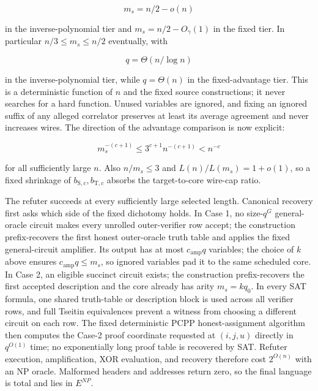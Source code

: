 \documentclass[11pt,letterpaper]{article}
\theoremstyle{definition}
\theoremstyle{remark}
\begin{document}
\[
m_s=n/2-o(n)
\]

in the inverse-polynomial tier and \(m_s=n/2-O_\gamma(1)\) in the fixed
tier. In particular \(n/3\le m_s\le n/2\) eventually, with

\[
q=\Theta(n/\log n)
\]

in the inverse-polynomial tier, while \(q=\Theta(n)\) in the
fixed-advantage tier. This is a deterministic function of \(n\) and the
fixed source constructions; it never searches for a hard function.
Unused variables are ignored, and fixing an ignored suffix of any
alleged correlator preserves at least its average agreement and never
increases wires. The direction of the advantage comparison is now
explicit:

\[
m_s^{-(c+1)}
\le
3^{c+1}n^{-(c+1)}
<n^{-c}
\]

for all sufficiently large \(n\). Also \(n/m_s\le3\) and
\(L(n)/L(m_s)=1+o(1)\), so a fixed shrinkage of
\(b_{\mathrm S,c},b_{\mathrm T,c}\) absorbs the target-to-core wire-cap
ratio.

The refuter succeeds at every sufficiently large selected length.
Canonical recovery first asks which side of the fixed dichotomy holds.
In Case 1, no size-\(q^G\) general-oracle circuit makes every unrolled
outer-verifier row accept; the construction prefix-recovers the first
honest outer-oracle truth table and applies the fixed general-circuit
amplifier. Its output has at most \(c_{\mathrm{amp}}q\) variables; the
choice of \(k\) above ensures \(c_{\mathrm{amp}}q\le m_s\), so ignored
variables pad it to the same scheduled core. In Case 2, an eligible
succinct circuit exists; the construction prefix-recovers the first
accepted description and the core already has arity \(m_s=kq_0\). In
every SAT formula, one shared truth-table or description block is used
across all verifier rows, and full Tseitin equivalences prevent a
witness from choosing a different circuit on each row. The fixed
deterministic PCPP honest-assignment algorithm then computes the Case-2
proof coordinate requested at \((i,j,u)\) directly in \(q^{O(1)}\) time;
no exponentially long proof table is recovered by SAT. Refuter
execution, amplification, XOR evaluation, and recovery therefore cost
\(2^{O(n)}\) with an NP oracle. Malformed headers and addresses return
zero, so the final language is total and lies in \(E^{NP}\).
\end{document}

